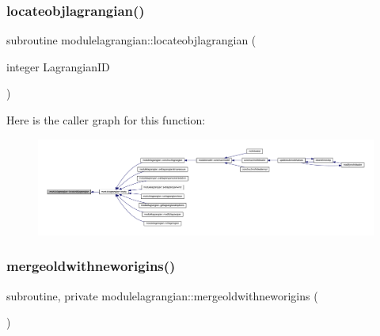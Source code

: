 \subsubsection{\texorpdfstring{locateobjlagrangian()}{locateobjlagrangian()}}
{\footnotesize\ttfamily subroutine modulelagrangian\+::locateobjlagrangian (\begin{DoxyParamCaption}\item[{integer}]{Lagrangian\+ID }\end{DoxyParamCaption})\hspace{0.3cm}{\ttfamily [private]}}

Here is the caller graph for this function\+:\nopagebreak
\begin{figure}[H]
\begin{center}
\leavevmode
\includegraphics[width=350pt]{namespacemodulelagrangian_a42e447276e6e4455d7699fb38f9d67f0_icgraph}
\end{center}
\end{figure}
\mbox{\label{namespacemodulelagrangian_aec5a7d886f857814caf3bbd5957b5359}} 
\subsubsection{\texorpdfstring{mergeoldwithneworigins()}{mergeoldwithneworigins()}}
{\footnotesize\ttfamily subroutine, private modulelagrangian\+::mergeoldwithneworigins (\begin{DoxyParamCaption}{ }\end{DoxyParamCaption})\hspace{0.3cm}{\ttfamily [private]}}

